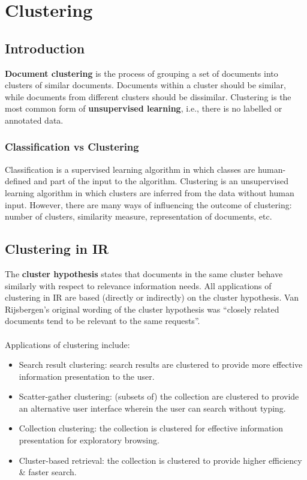\documentclass[a4paper,11pt]{article}
\begin{document}
\section{Clustering}
\subsection{Introduction}
\textbf{Document clustering} is the process of grouping a set of documents into clusters of similar documents.
Documents within a cluster should be similar, while documents from different clusters should be dissimilar.
Clustering is the most common form of \textbf{unsupervised learning}, i.e., there is no labelled or annotated data.

\subsubsection{Classification vs Clustering}
Classification is a supervised learning algorithm in which classes are human-defined and part of the input to the algorithm.
Clustering is an unsupervised learning algorithm in which clusters are inferred from the data without human input.
However, there are many ways of influencing the outcome of clustering: number of clusters, similarity measure, representation of documents, etc.

\subsection{Clustering in IR}
The \textbf{cluster hypothesis} states that documents in the same cluster behave similarly with respect to relevance information needs.
All applications of clustering in IR are based (directly or indirectly) on the cluster hypothesis.
Van Rijsbergen's original wording of the cluster hypothesis was ``closely related documents tend to be relevant to the same requests''.
\\\\
Applications of clustering include:
\begin{itemize}
    \item   Search result clustering: search results are clustered to provide more effective information presentation to the user.
    \item   Scatter-gather clustering: (subsets of) the collection are clustered to provide an alternative user interface wherein the user can search without typing.
    \item   Collection clustering: the collection is clustered for effective information presentation for exploratory browsing.
    \item   Cluster-based retrieval: the collection is clustered to provide higher efficiency \& faster search.
\end{itemize}
\end{document}
